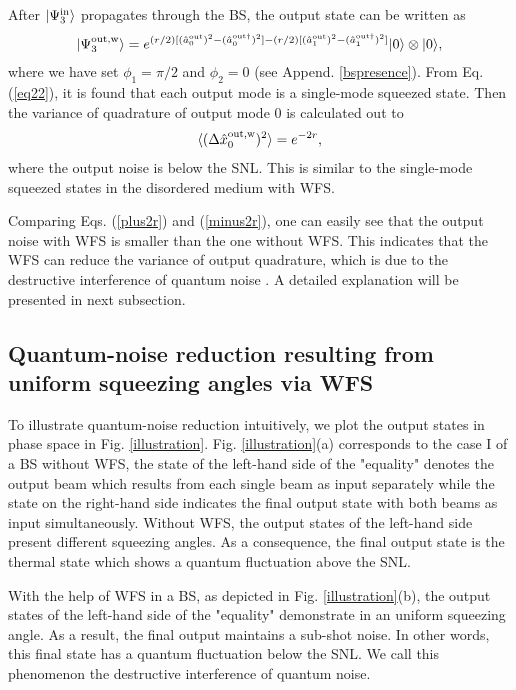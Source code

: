 \documentclass[9pt,twocolumn,twoside]{osajnl}
\begin{document}
After $|\Psi^{\rm{in}}_3 \rangle$ propagates through the BS, the output state can be written as
\begin{align}
\label{eq22}
|\Psi^{\rm{out,w}}_3\rangle = e^{(r/2) [(\hat{a}_0^{\rm{out} })^2 - (\hat{a}_0^{\rm{out}\dagger})^{ 2}] - (r/2) [(\hat{a}_1^{\rm{out} })^2 - (\hat{a}_1^{\rm{out}\dagger})^{ 2}]}|0\rangle \otimes |0\rangle,
\end{align}
where we have set $\phi_1 = \pi/2$ and $\phi_2 = 0$ (see Append. \ref{bspresence}). From Eq. (\ref{eq22}), it is found that each output mode is a single-mode squeezed state. Then the variance of quadrature of output mode $0$ is calculated out to
\begin{align}
\label{minus2r}
\langle (\Delta \hat{x}_{0}^{\rm{out,w}})^2 \rangle = e^{-2r},
\end{align} 
where the output noise is below the SNL. This is similar to the single-mode squeezed states in the disordered medium with WFS.

Comparing Eqs. (\ref{plus2r}) and (\ref{minus2r}), one can easily see that the output noise with WFS is smaller than the one without WFS. This indicates that the WFS can reduce the variance of output quadrature, which is due to the destructive interference of quantum noise \cite{elste2009}. A detailed explanation will be presented in next subsection.

\subsection{Quantum-noise reduction resulting from uniform squeezing angles via WFS}

To illustrate quantum-noise reduction intuitively, we plot the output states in phase space in Fig. \ref{illustration}. Fig. \ref{illustration}(a) corresponds to the case I of a BS without WFS, the state of the left-hand side of the "equality" denotes the output beam which results from each single beam as input separately while the state on the right-hand side indicates the final output state with both beams as input simultaneously. Without WFS, the output states of the left-hand side present different squeezing angles. As a consequence, the final output state is the thermal state which shows a quantum fluctuation above the SNL. 

With the help of WFS in a BS, as depicted in Fig. \ref{illustration}(b), the output states of the left-hand side of the "equality" demonstrate in an uniform squeezing angle. As a result, the final output maintains a sub-shot noise. In other words, this final state has a quantum fluctuation below the SNL. We call this phenomenon the destructive interference of quantum noise.
\end{document}

